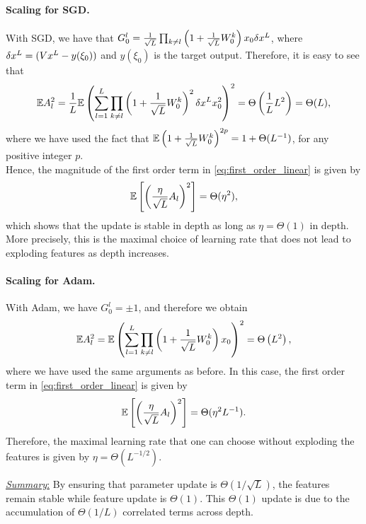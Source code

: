 \documentclass{article}
\theoremstyle{plain}
\theoremstyle{definition}
\begin{document}
\paragraph{Scaling for SGD.} With SGD,  we have that $G^l_0 = \frac{1}{\sqrt{L}} \prod_{k \neq l} \left(1 + \frac{1}{\sqrt{L}} W^k_0\right) x_0 \delta x^L$, where $\delta x^L = (V x^L - y(\xi_0))$ and $y(\xi_0)$ is the target output. 
Therefore, it is easy to see that 
\begin{align*}
\mathbb{E} A_l^2 = \frac{1}{L} \mathbb{E} \left(\sum_{l=1}^L \prod_{k \neq l}\left(1 + \frac{1}{\sqrt{L}} W^k_0\right)^2 \delta x^L x_0^2 \right)^2 = \Theta\left(\frac{1}{L} L^2\right) = \Theta(L),
\end{align*}
where we have used the fact that $\mathbb{E}\left(1 + \frac{1}{\sqrt{L}} W^k_0\right)^{2p} = 1 + \Theta(L^{-1})$, for any positive integer $p$.\\

Hence, the magnitude of the first order term in \cref{eq:first_order_linear} is given by 
$$
\mathbb{E}\left[ \left(\frac{\eta}{\sqrt{L}} A_l\right)^2\right] = \Theta(\eta^2),
$$
which shows that the update is stable in depth as long as $\eta = \Theta(1)$ in depth. More precisely, this is the maximal choice of learning rate that does not lead to exploding features as depth increases.

\paragraph{Scaling for Adam.} With Adam, we have $G^l_0 = \pm 1$, and therefore we obtain
\begin{align*}
\mathbb{E} A_l^2 =  \mathbb{E} \left(\sum_{l=1}^L \prod_{k \neq l}\left(1 + \frac{1}{\sqrt{L}} W^k_0\right) x_0 \right)^2 = \Theta\left(L^2\right),
\end{align*}
where we have used the same arguments as before. In this case, the first order term in \cref{eq:first_order_linear} is given by
$$
\mathbb{E}\left[ \left(\frac{\eta}{\sqrt{L}} A_l\right)^2\right] = \Theta(\eta^2 L^{-1}).
$$
Therefore, the maximal learning rate that one can choose without exploding the features is given by $\eta = \Theta(L^{-1/2})$.

\underline{\textit{Summary}:} By ensuring that parameter update is $\Theta(1/\sqrt{L})$, the features remain stable while feature update is $\Theta(1)$. This $\Theta(1)$ update is due to the accumulation of $\Theta(1/L)$ correlated terms across depth.
\end{document}
